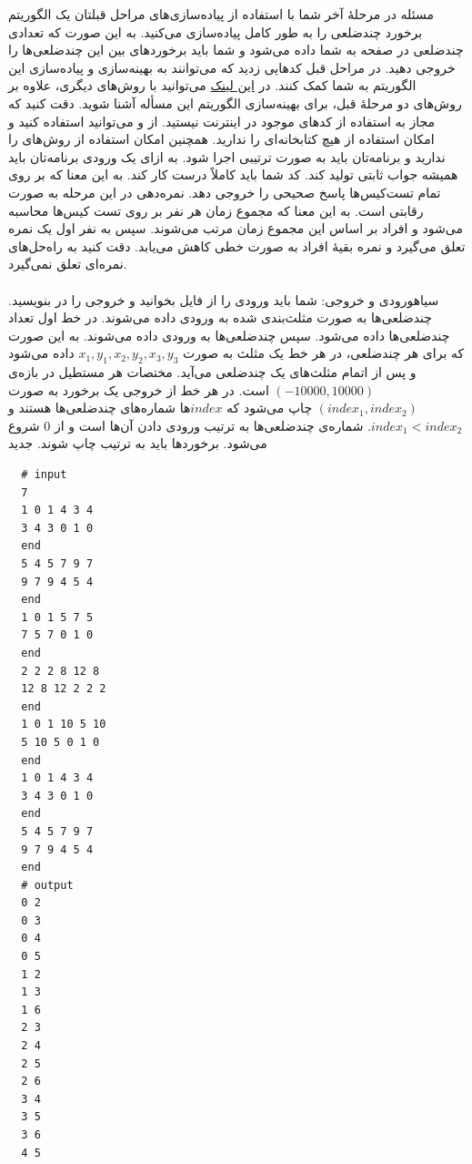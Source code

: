 ‌مسئله 
در مرحله‌ٔ آخر شما با استفاده از پیاده‌سازی‌های مراحل قبلتان یک الگوریتم برخورد چندضلعی را به طور کامل پیاده‌سازی می‌کنید. به این صورت که تعدادی چندضلعی در صفحه  به شما داده می‌شود و شما باید برخوردهای بین این چندضلعی‌ها را خروجی دهید. در مراحل قبل کدهایی زدید که می‌توانند به بهینه‌سازی و پیاده‌سازی این الگوریتم به شما کمک کنند. در 
\href{https://en.wikipedia.org/wiki/Collision_detection}{این لینک}
 می‌توانید با روش‌های دیگری، علاوه بر روش‌های دو مرحله‌ٔ قبل، برای بهینه‌سازی الگوریتم این مسأله آشنا شوید. دقت کنید که مجاز به استفاده از کدهای موجود در اینترنت نیستید. از  و  می‌توانید استفاده کنید و امکان استفاده از هیچ کتابخانه‌ای را ندارید. همچنین امکان استفاده از روش‌های  را ندارید و برنامه‌تان باید به صورت ترتیبی اجرا شود. به ازای یک ورودی برنامه‌تان باید  همیشه جواب ثابتی تولید کند. کد شما باید کاملاً درست کار کند. به این معنا که بر روی تمام تست‌کیس‌ها پاسخ صحیحی را خروجی دهد. نمره‌دهی در این مرحله به صورت رقابتی است. به این معنا که مجموع زمان هر نفر بر روی تست کیس‌ها محاسبه می‌شود و افراد بر اساس این مجموع زمان مرتب می‌شوند. سپس به نفر اول یک نمره تعلق می‌گیرد و نمره بقیۀ افراد به صورت خطی کاهش می‌یابد. دقت کنید به راه‌حل‌های  نمره‌ای تعلق نمی‌گیرد.
 \\
 \\
 ‌سیاه{ورودی و خروجی:}
 شما باید ورودی را از فایل  بخوانید و خروجی را در  بنویسید. چندضلعی‌ها به صورت مثلث‌بندی شده به ورودی داده می‌شوند. در خط اول تعداد چندضلعی‌ها داده می‌شود. سپس چندضلعی‌ها به ورودی داده می‌شوند. به این صورت که برای هر چندضلعی، در هر خط یک مثلث به صورت 
 $x_1, y_1, x_2, y_2, x_3, y_3$
  داده می‌شود و پس از اتمام مثلث‌های یک چندضلعی  می‌آید. مختصات هر مستطیل در بازه‌ی $(-10000, 10000)$ است. در هر خط از خروجی یک برخورد به صورت $(index_1, index_2)$ چاپ می‌شود که $index$ها شماره‌های چندضلعی‌ها هستند و $index_1 < index_2$. شماره‌ی چندضلعی‌ها به ترتیب ورودی دادن آن‌ها است و از $0$ شروع می‌شود. برخوردها باید به ترتیب چاپ شوند.
 ‌جدید
  
  \begin{latin}
  \begin{lstlisting}
  # input
  7
  1 0 1 4 3 4
  3 4 3 0 1 0
  end
  5 4 5 7 9 7
  9 7 9 4 5 4
  end
  1 0 1 5 7 5
  7 5 7 0 1 0
  end
  2 2 2 8 12 8
  12 8 12 2 2 2
  end
  1 0 1 10 5 10
  5 10 5 0 1 0
  end
  1 0 1 4 3 4
  3 4 3 0 1 0
  end
  5 4 5 7 9 7
  9 7 9 4 5 4
  end
  # output
  0 2
  0 3
  0 4
  0 5
  1 2
  1 3
  1 6
  2 3
  2 4
  2 5
  2 6
  3 4
  3 5
  3 6
  4 5
  \end{lstlisting}
  \end{latin}

